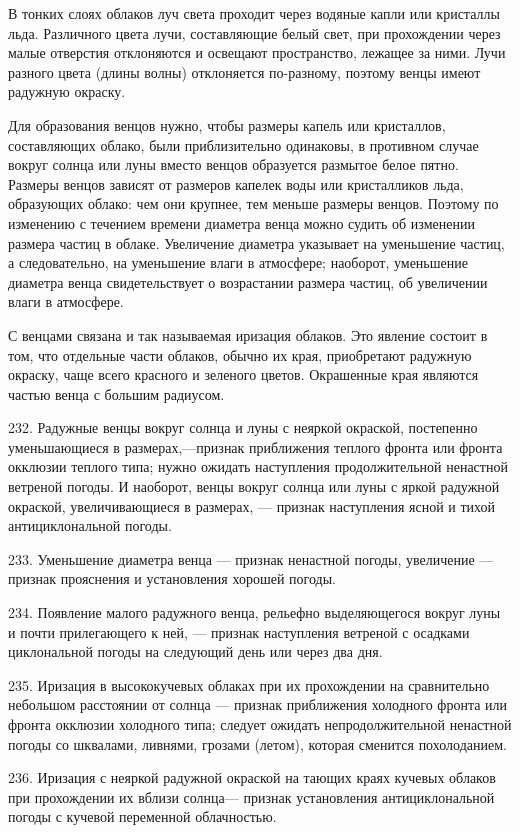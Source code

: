 В тонких слоях облаков луч света проходит через водяные капли или кристаллы льда. Различного цвета лучи, составляющие белый свет, при прохождении через малые отверстия отклоняются и освещают пространство, лежащее за ними. Лучи разного цвета (длины волны) отклоняется по-разному, поэтому венцы имеют радужную окраску.

Для образования венцов нужно, чтобы размеры капель или кристаллов, составляющих облако, были приблизительно одинаковы, в противном случае вокруг солнца или луны вместо венцов образуется размытое белое пятно. Размеры венцов зависят от размеров капелек воды или кристалликов льда, образующих облако: чем они крупнее, тем меньше размеры венцов. Поэтому по изменению с течением времени диаметра венца можно судить об изменении размера частиц в облаке. Увеличение диаметра указывает на уменьшение частиц, а следовательно, на уменьшение влаги в атмосфере; наоборот, уменьшение диаметра венца свидетельствует о возрастании размера частиц, об увеличении влаги в атмосфере.

С венцами связана и так называемая иризация облаков. Это явление состоит в том, что отдельные части облаков, обычно их края, приобретают радужную окраску, чаще всего красного и зеленого цветов. Окрашенные края являются частью венца с большим радиусом.

232. Радужные венцы вокруг солнца и луны с неяркой окраской, постепенно уменьшающиеся в размерах,—признак приближения теплого фронта или фронта окклюзии теплого типа; нужно ожидать наступления продолжительной ненастной ветреной погоды. И наоборот, венцы вокруг солнца или луны с яркой радужной окраской, увеличивающиеся в размерах, — признак наступления ясной и тихой антициклональной погоды.

233. Уменьшение диаметра венца — признак ненастной погоды, увеличение — признак прояснения и установления хорошей погоды.

234. Появление малого радужного венца, рельефно выделяющегося вокруг луны и почти прилегающего к ней, — признак наступления ветреной с осадками циклональной погоды на следующий день или через два дня.

235. Иризация в высококучевых облаках при их прохождении на сравнительно небольшом расстоянии от солнца — признак приближения холодного фронта или фронта окклюзии холодного типа; следует ожидать непродолжительной ненастной погоды со шквалами, ливнями, грозами (летом), которая сменится похолоданием.

236. Иризация с неяркой радужной окраской на тающих краях кучевых облаков при прохождении их вблизи солнца— признак установления антициклональной погоды с кучевой переменной облачностью.

